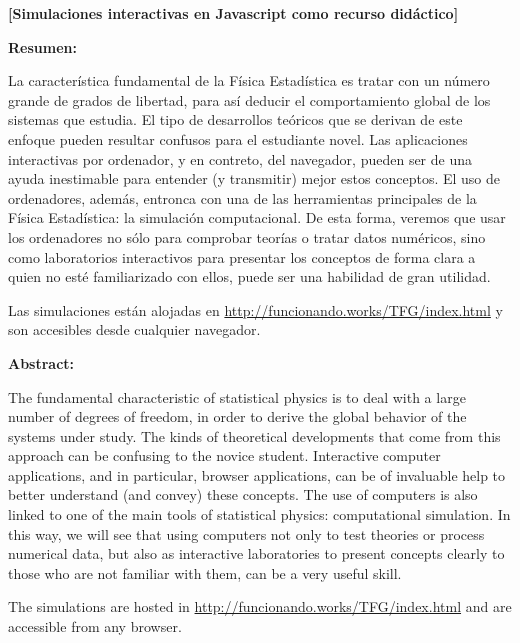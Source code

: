 \documentclass[11pt, a4paper]{article} %
\theoremstyle{named}
\begin{document}
{\bfseries \large [Simulaciones interactivas en Javascript como recurso didáctico] }\vspace{10mm}

{\bfseries \large Resumen:} \vspace{5mm}

La característica fundamental de la Física Estadística es tratar con un número grande de grados de libertad, para así deducir el comportamiento global de los sistemas que estudia. El tipo de desarrollos teóricos que se derivan de este enfoque pueden resultar confusos para el estudiante novel. Las aplicaciones interactivas por ordenador, y en contreto, del navegador, pueden ser de una ayuda inestimable para entender (y transmitir) mejor estos conceptos. El uso de ordenadores, además, entronca con una de las herramientas principales de la Física Estadística: la simulación computacional. De esta forma, veremos que usar los ordenadores no sólo para comprobar teorías o tratar datos numéricos, sino como laboratorios interactivos para presentar los conceptos de forma clara a quien no esté familiarizado con ellos, puede ser una habilidad de gran utilidad.

Las simulaciones están alojadas en \url{http://funcionando.works/TFG/index.html} y son accesibles desde cualquier navegador.

\vspace{1cm}

{\bfseries \large Abstract: }\vspace{5mm}

The fundamental characteristic of statistical physics is to deal with a large number of degrees of freedom, in order to derive the global behavior of the systems under study. The kinds of theoretical developments that come from this approach can be confusing to the novice student. Interactive computer applications, and in particular, browser applications, can be of invaluable help to better understand (and convey) these concepts. The use of computers is also linked to one of the main tools of statistical physics: computational simulation. In this way, we will see that using computers not only to test theories or process numerical data, but also as interactive laboratories to present concepts clearly to those who are not familiar with them, can be a very useful skill.

The simulations are hosted in \url{http://funcionando.works/TFG/index.html} and are accessible from any browser.

\vspace{1cm}
\end{document}
